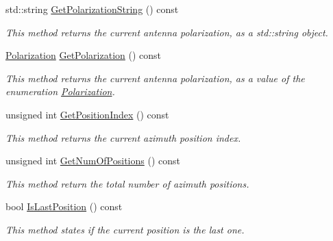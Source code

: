 \begin{DoxyCompactItemize}
std\+::string \hyperlink{classAntennaPositioner_a897b759fa711bd8a4261e57177e3db1c}{Get\+Polarization\+String} () const
\begin{DoxyCompactList}\small\item\em This method returns the current antenna polarization, as a {\ttfamily std\+::string} object. \end{DoxyCompactList}\item 
\mbox{\label{classAntennaPositioner_a590e07740567be77f677d822cf63b69a}} 
\hyperlink{AntennaPositioning_8h_a55887c7bc32d70c0308472ff4de3e282}{Polarization} \hyperlink{classAntennaPositioner_a590e07740567be77f677d822cf63b69a}{Get\+Polarization} () const
\begin{DoxyCompactList}\small\item\em This method returns the current antenna polarization, as a value of the enumeration \hyperlink{AntennaPositioning_8h_a55887c7bc32d70c0308472ff4de3e282}{Polarization}. \end{DoxyCompactList}\item 
\mbox{\label{classAntennaPositioner_aa77a4d7ef1dd79ae4253167ebaf66a5e}} 
unsigned int \hyperlink{classAntennaPositioner_aa77a4d7ef1dd79ae4253167ebaf66a5e}{Get\+Position\+Index} () const
\begin{DoxyCompactList}\small\item\em This method returns the current azimuth position index. \end{DoxyCompactList}\item 
\mbox{\label{classAntennaPositioner_a62c014613a812a0d2948dcebb0b1c9dc}} 
unsigned int \hyperlink{classAntennaPositioner_a62c014613a812a0d2948dcebb0b1c9dc}{Get\+Num\+Of\+Positions} () const
\begin{DoxyCompactList}\small\item\em This method return the total number of azimuth positions. \end{DoxyCompactList}\item 
\mbox{\label{classAntennaPositioner_a512104fe937395e266284eded6a8359d}} 
bool \hyperlink{classAntennaPositioner_a512104fe937395e266284eded6a8359d}{Is\+Last\+Position} () const
\begin{DoxyCompactList}\small\item\em This method states if the current position is the last one. \end{DoxyCompactList}\end{DoxyCompactItemize}


